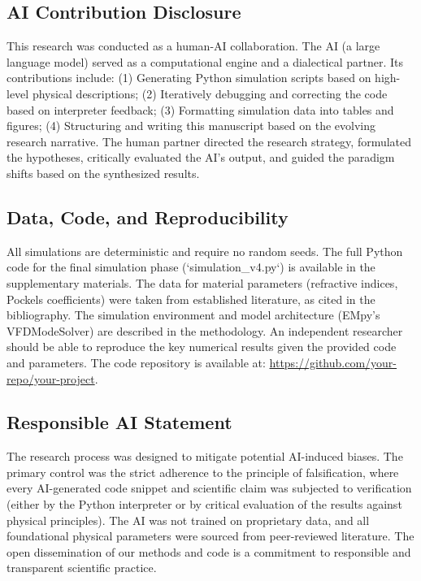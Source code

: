 \documentclass[conference]{IEEEtran} %
\begin{document}
\subsection{AI Contribution Disclosure}
This research was conducted as a human-AI collaboration. The AI (a large language model) served as a computational engine and a dialectical partner. Its contributions include: (1) Generating Python simulation scripts based on high-level physical descriptions; (2) Iteratively debugging and correcting the code based on interpreter feedback; (3) Formatting simulation data into tables and figures; (4) Structuring and writing this manuscript based on the evolving research narrative. The human partner directed the research strategy, formulated the hypotheses, critically evaluated the AI's output, and guided the paradigm shifts based on the synthesized results.

\subsection{Data, Code, and Reproducibility}
All simulations are deterministic and require no random seeds. The full Python code for the final simulation phase (`simulation_v4.py`) is available in the supplementary materials. The data for material parameters (refractive indices, Pockels coefficients) were taken from established literature, as cited in the bibliography. The simulation environment and model architecture (EMpy's VFDModeSolver) are described in the methodology. An independent researcher should be able to reproduce the key numerical results given the provided code and parameters. The code repository is available at: \href{https://github.com/your-repo/your-project}{https://github.com/your-repo/your-project}.

\subsection{Responsible AI Statement}
The research process was designed to mitigate potential AI-induced biases. The primary control was the strict adherence to the principle of falsification, where every AI-generated code snippet and scientific claim was subjected to verification (either by the Python interpreter or by critical evaluation of the results against physical principles). The AI was not trained on proprietary data, and all foundational physical parameters were sourced from peer-reviewed literature. The open dissemination of our methods and code is a commitment to responsible and transparent scientific practice.
\end{document}
